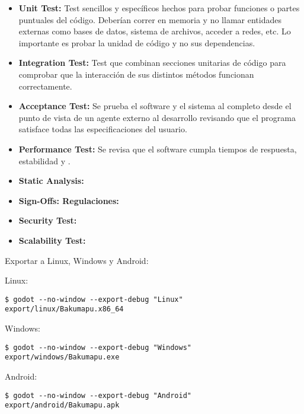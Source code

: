 \begin{itemize}
  \item \textbf{Unit Test:} Test sencillos y específicos hechos para probar
      funciones o partes puntuales del código. Deberían correr en memoria y no
      llamar entidades externas como bases de datos, sistema de archivos,
      acceder a redes, etc. Lo importante es probar la unidad de código y no
      sus dependencias. \item \textbf{Integration Test:} Test que combinan
      secciones unitarias de código para comprobar que la interacción de sus
      distintos métodos funcionan correctamente.
  \item \textbf{Acceptance Test:} Se prueba el software y el sistema al
      completo desde el punto de vista de un agente externo al desarrollo
      revisando que el programa satisface todas las especificaciones del
      usuario. \item \textbf{Performance Test:} Se revisa que el software
      cumpla tiempos de respuesta, estabilidad y .
  \item \textbf{Static Analysis:} 
  \item \textbf{Sign-Offs: Regulaciones:} 
  \item \textbf{Security Test:} 
  \item \textbf{Scalability Test:} 
\end{itemize}


Exportar a Linux, Windows y Android:

Linux:
\begin{lstlisting}
$ godot --no-window --export-debug "Linux" export/linux/Bakumapu.x86_64
\end{lstlisting}

Windows:
\begin{lstlisting}
$ godot --no-window --export-debug "Windows" export/windows/Bakumapu.exe
\end{lstlisting}

Android:
\begin{lstlisting}
$ godot --no-window --export-debug "Android" export/android/Bakumapu.apk
\end{lstlisting}
